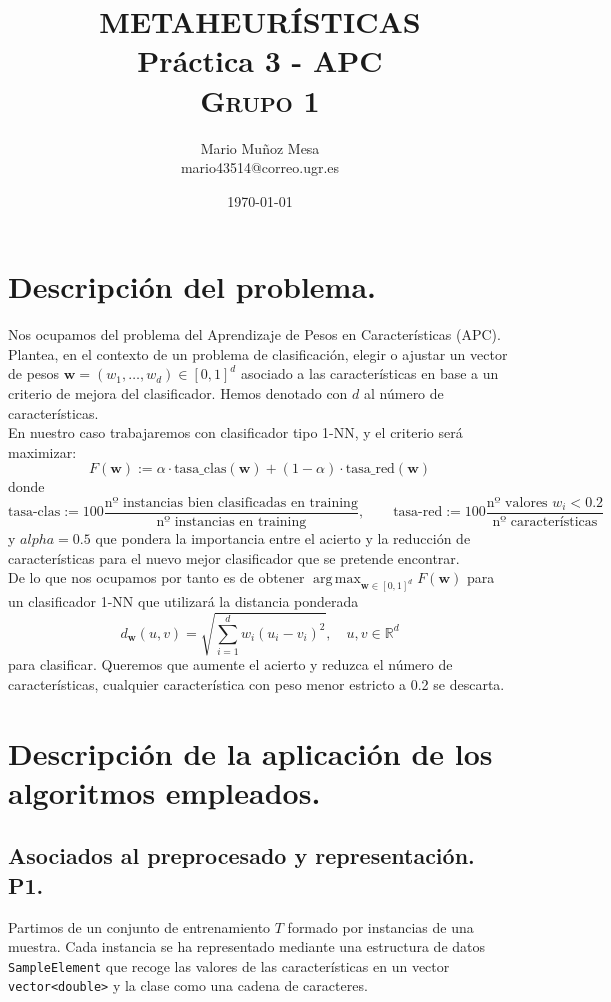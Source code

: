 \documentclass[11pt,a4paper]{article}
\title{
\normalfont \normalsize 
\textsc{\small METAHEURÍSTICAS} \\ [10pt]
	
	
\huge{\textbf{Práctica 3 - APC}}\\

\textsc{\small Grupo 1} \\ [10pt]

	}
\author{Mario Muñoz Mesa\\ mario43514@correo.ugr.es}
\date{\today}
\DeclareMathOperator*{\argmax}{arg\,max}
\theoremstyle{definition}
\newcommand{\R}{\mathbb{R}}
\begin{document}
	\maketitle
	\newpage
	\renewcommand*\contentsname{Índice}	
	\tableofcontents
	
	\newpage
	
	\section{Descripción del problema.}
	Nos ocupamos del problema del Aprendizaje de Pesos en Características (APC). Plantea, en el contexto de un problema de clasificación, elegir o ajustar un vector de pesos $\textbf{w}=(w_1,\ldots, w_d)\in [0,1]^d$ asociado a las características en base a un criterio de mejora del clasificador. Hemos denotado con $d$ al número de características.\\
	
	En nuestro caso trabajaremos con clasificador tipo 1-NN, y el criterio será maximizar:
	$$F(\textbf{w}):=\alpha\cdot \text{tasa\_clas}(\textbf{w})+(1-\alpha ) \cdot \text{tasa\_red}(\textbf{w})$$
	donde
	$$\text{tasa-clas}:=100\frac{\text{nº instancias bien clasificadas en training}}{\text{nº instancias en training}}, \quad \quad \text{tasa-red}:=100\frac{\text{nº valores } w_i <0.2}{\text{nº características}}$$
	y $alpha=0.5$ que pondera la importancia entre el acierto y la reducción de características para el nuevo mejor clasificador que se pretende encontrar.\\
	
	De lo que nos ocupamos por tanto es de obtener $\argmax_{\textbf{w}\in [0,1]^d} F(\textbf{w})$ para un clasificador 1-NN que utilizará la distancia ponderada
	$$d_{\textbf{w}}(u,v)=\sqrt{\sum_{i=1}^d w_i(u_i-v_i)^2}, \quad u,v\in \R^d$$
	para clasificar. Queremos que aumente el acierto y reduzca el número de características, cualquier característica con peso menor estricto a 0.2 se descarta.
	
	
	\newpage
	\section{Descripción de la aplicación de los algoritmos empleados.}
	\subsection{Asociados al preprocesado y representación. P1.}
	Partimos de un conjunto de entrenamiento $T$ formado por instancias de una muestra. Cada instancia se ha representado mediante una estructura de datos \texttt{SampleElement} que recoge las valores de las características en un vector \texttt{vector<double>} y la clase como una cadena de caracteres.
	
\end{document}
